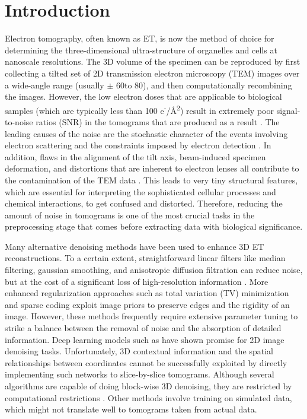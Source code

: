 \chapter{Introduction}\label{ch:Introduction}
Electron tomography, often known as ET, is now the method of choice for determining the three-dimensional ultra-structure of organelles and cells at nanoscale resolutions. The 3D volume of the specimen can be reproduced by first collecting a tilted set of 2D transmission electron microscopy (TEM) images over a wide-angle range (usually $\pm$ 60\textdegree to 80\textdegree), and then computationally recombining the images. However, the low electron doses that are applicable to biological samples (which are typically less than 100 e\textsuperscript{-}/Å\textsuperscript{2}) result in extremely poor signal-to-noise ratios (SNR) in the tomograms that are produced as a result \cite{Frangakis2021}. The leading causes of the noise are the stochastic character of the events involving electron scattering and the constraints imposed by electron detection \cite{Joy2008}. In addition, flaws in the alignment of the tilt axis, beam-induced specimen deformation, and distortions that are inherent to electron lenses all contribute to the contamination of the TEM data \cite{Joy2008}. This leads to very tiny structural features, which are essential for interpreting the sophisticated cellular processes and chemical interactions, to get confused and distorted. Therefore, reducing the amount of noise in tomograms is one of the most crucial tasks in the preprocessing stage that comes before extracting data with biological significance.
\vspace{10pt}





Many alternative denoising methods have been used to enhance 3D ET reconstructions.
 To a certain extent, straightforward linear filters like median filtering, gaussian smoothing, and anisotropic diffusion filtration can reduce noise, but at the cost of a significant loss of high-resolution information \cite{Frangakis2001}. More enhanced regularization approaches such as total variation (TV) minimization and sparse coding exploit image priors to preserve edges and the rigidity of an image. However, these methods frequently require extensive parameter tuning to strike a balance between the removal of noise and the absorption of detailed information. Deep learning models such as \cite{Fernandez2023} have shown promise for 2D image denoising tasks. Unfortunately, 3D contextual information and the spatial relationships between coordinates cannot be successfully exploited by directly implementing such networks to slice-by-slice tomograms. Although several algorithms are capable of doing block-wise 3D denoising, they are restricted by computational restrictions \cite{Fernandez2023}. Other methods involve training on simulated data, which might not translate well to tomograms taken from actual data. 

